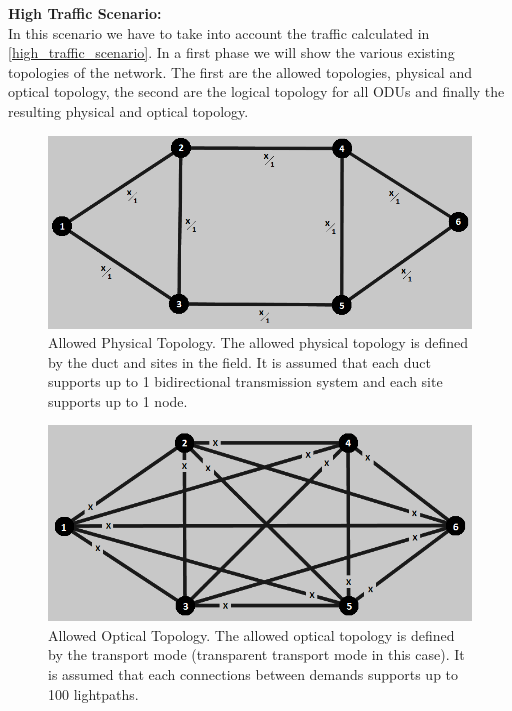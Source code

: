 \textbf{High Traffic Scenario:}\\

In this scenario we have to take into account the traffic calculated in \ref{high_traffic_scenario}. In a first phase we will show the various existing topologies of the network. The first are the allowed topologies, physical and optical topology, the second are the logical topology for all ODUs and finally the resulting physical and optical topology.\\

\begin{figure}[H]
\centering
\includegraphics[width=13cm]{sdf/heuristic/transparent_protection/high/allowed_physical_high}
\caption{Allowed Physical Topology. The allowed physical topology is defined by the duct and sites in the field. It is assumed that each duct supports up to 1 bidirectional transmission system and each site supports up to 1 node.}
\label{allowed_physical_protection_ref_high_heuristic_transparent}
\end{figure}

\begin{figure}[H]
\centering
\includegraphics[width=13cm]{sdf/heuristic/transparent_protection/high/allowed_optical_high}
\caption{Allowed Optical Topology. The allowed optical topology is defined by the transport mode (transparent transport mode in this case). It is assumed that each connections between demands supports up to 100 lightpaths.}
\label{allowed_optical_protection_ref_high_heuristic_transparent}
\end{figure}


